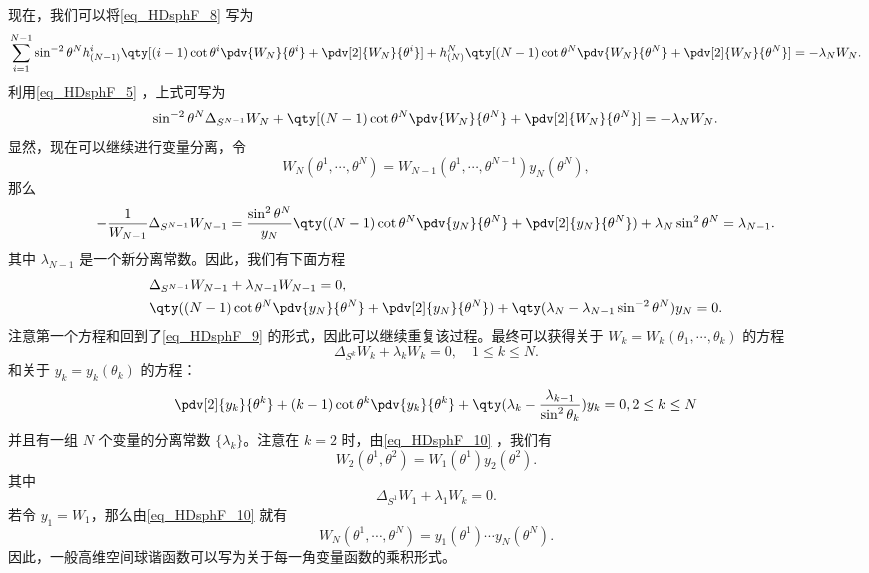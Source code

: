 现在，我们可以将\autoref{eq_HDsphF_8} 写为
\begin{equation}
\sum_{i=1}^{N-1} \sin^{-2}\theta^N h^{i}_{(N-1)}\qty[(i-1)\cot\theta^i\pdv{W_N}{\theta^i}+\pdv[2]{W_N}{\theta^i}]+h^{N}_{(N)}\qty[(N-1)\cot\theta^N\pdv{W_N}{\theta^N}+\pdv[2]{W_N}{\theta^N}]=-\lambda_N W_N.~
\end{equation}
利用\autoref{eq_HDsphF_5} ，上式可写为
\begin{equation}
\sin^{-2}\theta^N \Delta_{S^{N-1}}{W_N}+\qty[(N-1)\cot\theta^N\pdv{W_N}{\theta^N}+\pdv[2]{W_N}{\theta^N}]=-\lambda_N W_N.~
\end{equation}
显然，现在可以继续进行变量分离，令
\begin{equation}\label{eq_HDsphF_10}
W_N(\theta^1,\cdots,\theta^N)=W_{N-1}(\theta^1,\cdots,\theta^{N-1})y_N(\theta^N),~
\end{equation}
那么
\begin{equation}
-\frac{1}{W_{N-1}}\Delta_{S^{N-1}}W_{N-1}=\frac{\sin^2\theta^N}{y_N}\qty((N-1)\cot\theta^N\pdv{y_N}{\theta^N}+\pdv[2]{y_N}{\theta^N})+\lambda_N\sin^2\theta^N=\lambda_{N-1}.~
\end{equation}
其中 $\lambda_{N-1}$ 是一个新分离常数。因此，我们有下面方程
\begin{equation}
\begin{aligned}
&\Delta_{S^{N-1}}W_{N-1}+\lambda_{N-1}W_{N-1}=0,\\
&\qty((N-1)\cot\theta^N\pdv{y_N}{\theta^N}+\pdv[2]{y_N}{\theta^N})+\qty(\lambda_N-\lambda_{N-1}\sin^{-2}\theta^N)y_N=0.
\end{aligned}~
\end{equation}
注意第一个方程和回到了\autoref{eq_HDsphF_9} 的形式，因此可以继续重复该过程。最终可以获得关于 $W_k=W_k(\theta_1,\cdots,\theta_k)$ 的方程
\begin{equation}
\Delta_{S^{k}}W_{k}+\lambda_{k}W_{k}=0,\quad 1\leq k\leq N.~
\end{equation}
和关于 $y_k=y_k(\theta_k)$ 的方程：
\begin{equation}
\pdv[2]{y_k}{\theta^k}+(k-1)\cot\theta^k\pdv{y_k}{\theta^k}+\qty(\lambda_k-\frac{\lambda_{k-1}}{\sin^2\theta_k})y_k=0,2\leq k\leq N~
\end{equation}
并且有一组 $N$ 个变量的分离常数 $\{\lambda_k\}$。注意在 $k=2$ 时，由\autoref{eq_HDsphF_10} ，我们有
\begin{equation}
W_2(\theta^1,\theta^2)=W_1(\theta^1)y_2(\theta^2).~
\end{equation}
其中
\begin{equation}
\Delta_{S^{1}}W_{1}+\lambda_{1}W_{k}=0.~
\end{equation}
若令 $y_1=W_1$，那么由\autoref{eq_HDsphF_10} 就有
\begin{equation}
W_N(\theta^1,\cdots,\theta^N)=y_1(\theta^1)\cdots y_N(\theta^N).~
\end{equation}
因此，一般高维空间球谐函数可以写为关于每一角变量函数的乘积形式。








